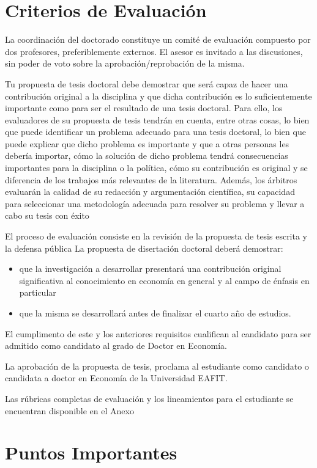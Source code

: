 \section{Criterios de Evaluación}

La coordinación del doctorado constituye un comité de evaluación compuesto por dos profesores, preferiblemente externos. El asesor es invitado a las discusiones, sin poder de voto sobre la aprobación/reprobación de la misma.

Tu propuesta de tesis doctoral debe demostrar que será capaz de hacer una contribución original a la disciplina y que dicha contribución es lo suficientemente importante como para ser el resultado de una tesis doctoral. Para ello, los evaluadores de su propuesta de tesis tendrán en cuenta, entre otras cosas, lo bien que puede identificar un problema adecuado para una tesis doctoral, lo bien que puede explicar que dicho problema es importante y que a otras personas les debería importar, cómo la solución de dicho problema tendrá consecuencias importantes para la disciplina o la política, cómo su contribución es original y se diferencia de los trabajos más relevantes de la literatura. Además, los árbitros evaluarán la calidad de su redacción y argumentación científica, su capacidad para seleccionar una metodología adecuada para resolver su problema y llevar a cabo su tesis con éxito

El proceso de evaluación consiste en la revisión de la propuesta de tesis escrita y la defensa pública
La propuesta de disertación doctoral deberá demostrar: 
\begin{itemize}
    \item que la investigación a desarrollar presentará una contribución original significativa al conocimiento en economía en general y al campo de énfasis en particular
    \item que la misma se desarrollará antes de finalizar el cuarto año de estudios.
\end{itemize}

El cumplimento de este y los anteriores requisitos cualifican al candidato para ser admitido como candidato al grado de Doctor en Economía.

La aprobación de la propuesta de tesis, proclama al estudiante como candidato o candidata a doctor en Economía de la Universidad EAFIT.

Las rúbricas completas de evaluación y los lineamientos para el estudiante se encuentran disponible en el Anexo

\section{Puntos Importantes}


